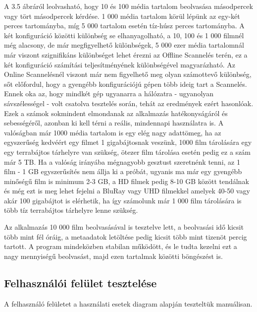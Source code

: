 A 3.5 ábráról leolvasható, hogy 10 és 100 média tartalom beolvasása másodpercek vagy tört másodpercek kérdése. 1 000 média tartalom körül lépünk az egy-két perces tartományba, míg 5 000 tartalom esetén tíz-húsz perces tartományba. A két konfiguráció közötti különbség se elhanyagolható, a 10, 100 és 1 000 filmnél még alacsony, de már megfigyelhető különbségek, 5 000 ezer média tartalomnál már viszont szignifikáns különbséget lehet érezni az Offline Scannelés terén, ez a két konfiguráció számítási teljesítményének különbségével magyarázható. Az Online Scannelésnél viszont már nem figyelhető meg olyan számottevő különbség, sőt előfordul, hogy a gyengébb konfigurációjú gépen több ideig tart a Scannelés. Ennek oka az, hogy mindkét gép ugyanarra a hálózatra - ugyanolyan sávszélességel - volt csatolva tesztelés során, tehát az eredmények ezért hasonlóak.
Ezek a számok sokmindent elmondanak az alkalmazás hatékonyságáról és sebességéről, azonban ki kell térni a reális, mindennapi használatra is. A valóságban már 1000 média tartalom is egy elég nagy adattömeg, ha az egyszerűség kedvéért egy filmet 1 gigabájtosnak veszünk, 1000 film tárolására egy egy terrabájtos tárhelyre van szükség, ötezer film tárolása esetén pedig ez a szám már 5 TB. Ha a valóság irányába mégnagyobb gesztust szeretnénk tenni, az 1 film - 1 GB egyszerűsítés nem állja ki a próbát, ugyanis ma már egy gyengébb minőségű film is minimum 2-3 GB, a HD filmek pedig 8-10 GB között tendálnak és még ezt is meg lehet fejelni a BluRay vagy UHD filmekkel amelyek 40-50 vagy akár 100 gigabájtot is elérhetik, ha így számolunk már 1 000 film tárolására is több tíz terrabájtos tárhelyre lenne szükség.

Az alkalmazás 10 000 film beolvasásával is tesztelve lett, a beolvasási idő kicsit több mint fél óráig, a metaadatok letöltése pedig kicsit több mint tizenöt percig tartott. A program mindeközben stabilan működött, és le tudta kezelni ezt a nagy mennyiségű beolvasást, majd ezen tartalmak közötti böngészést is.

\cleardoublepage
\subsection{Felhasználói felület tesztelése}
A felhasználó felületet a használati esetek diagram alapján teszteltük manuálisan.

